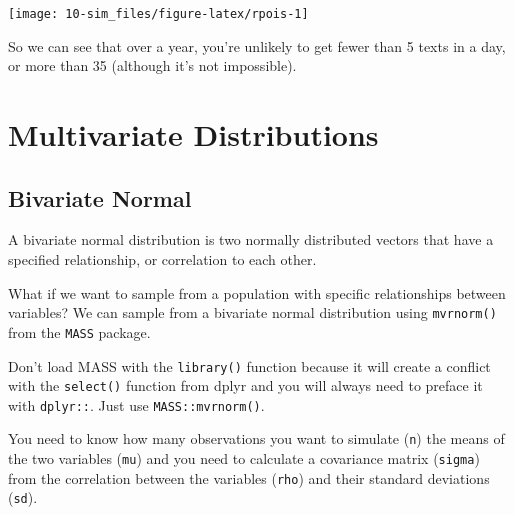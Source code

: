 \documentclass[
  oneside]{book}
\begin{document}
\begin{center}\texttt{[image: 10-sim\_files/figure-latex/rpois-1]} \end{center}

So we can see that over a year, you're unlikely to get fewer than 5 texts in a day, or more than 35 (although it's not impossible).

\hypertarget{mvdist}{%
\section{Multivariate Distributions}\label{mvdist}}

\hypertarget{bvn}{%
\subsection{Bivariate Normal}\label{bvn}}

A bivariate normal distribution is two normally distributed vectors that have a specified relationship, or correlation to each other.

What if we want to sample from a population with specific relationships between variables? We can sample from a bivariate normal distribution using \texttt{mvrnorm()} from the \texttt{MASS} package.

\begin{warning}
Don't load MASS with the \texttt{library()} function because it will create a conflict with the \texttt{select()} function from dplyr and you will always need to preface it with \texttt{dplyr::}. Just use \texttt{MASS::mvrnorm()}.

\end{warning}

You need to know how many observations you want to simulate (\texttt{n}) the means of the two variables (\texttt{mu}) and you need to calculate a covariance matrix (\texttt{sigma}) from the correlation between the variables (\texttt{rho}) and their standard deviations (\texttt{sd}).
\end{document}
